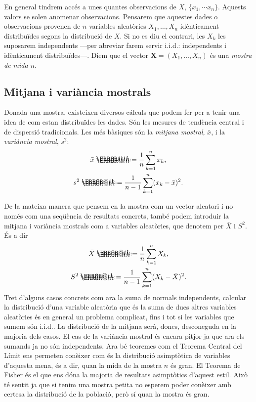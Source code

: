 \documentclass[12pt,twoside]{report}
\makeatletter
\numberwithin{table}{section}
\numberwithin{equation}{section}
\numberwithin{figure}{section}
\newcommand{\iid}{i.i.d.}
\renewcommand{\vec}[1]{\mathbf{#1}}
\newcommand*{\defeq}{\mathrel{\rlap{%
    \raisebox{0.3ex}{$\m@th\cdot$}}%
  \raisebox{-0.3ex}{$\m@th\cdot$}}%
	=
}
\makeatother
\begin{document}
En general tindrem accés a unes quantes observacions de \( X \), \( \{x_1, \cdots x_n\} \). Aquests valors se solen anomenar observacions. Pensarem que aquestes dades o observacions provenen de \( n \) variables aleatòries \( X_1, \dots, X_n \) idènticament distribuïdes segons la distribució de \( X \). Si no es diu el contrari, les \( X_k \) les suposarem independents ---per abreviar farem servir \iid: independents i idènticament distribuïdes---. Diem que el vector \( \vec{X} = (X_1, \dots, X_n) \) és una \emph{mostra de mida \( n \)}. 

\subsection{Mitjana i variància mostrals}
Donada una mostra, existeixen diversos cálculs que podem fer per a tenir una idea de com estan distribuïdes les dades. Són les mesures de tendència central i de dispersió tradicionals. Les més bàsiques són la \emph{mitjana mostral}, \( \bar{x} \), i la \emph{variància mostral}, \( s^2 \):
\begin{equation*}
	\begin{gathered}
		\bar{x} \defeq \frac{1}{n} \sum_{k = 1}^n x_k, \\
		s^2 \defeq \frac{1}{n - 1} \sum_{k = 1}^n (x_k - \bar{x})^2.
	\end{gathered}
\end{equation*}

De la mateixa manera que pensem en la mostra com un vector aleatori i no només com una seqüència de resultats concrets, també podem introduir la mitjana i variància mostrals com a variables aleatòries, que denotem per \( \bar{X} \) i \( S^2 \). És a dir
\begin{equation*}
\begin{gathered}
\bar{X} \defeq \frac{1}{n} \sum_{k = 1}^n	X_k, \\
S^2 \defeq	\frac{1}{n-1} \sum_{k = 1}^n (X_k - \bar{X})^2.
\end{gathered}
\end{equation*}
Tret d'alguns casos concrets com ara la suma de normals independents, calcular la distribució d'una variable aleatòria que és la suma de dues altres variables aleatòries és en general un problema complicat, fins i tot si les variables que sumem són \iid. La distribució de la mitjana serà, doncs, desconeguda en la majoria dels casos. El cas de la variància mostral és encara pitjor ja que ara els sumands ja no són independents. Ara bé teoremes com el Teorema Central del Límit ens permeten conèixer com és la distribució asimptòtica de variables d'aquesta mena, és a dir, quan la mida de la mostra \( n \) és gran. El Teorema de Fisher és el que ens dóna la majoria de resultats asimptòtics d'aquest estil. Això té sentit ja que si tenim una mostra petita no esperem poder conèixer amb certesa la distribució de la població, però sí quan la mostra és gran. 
\end{document}
